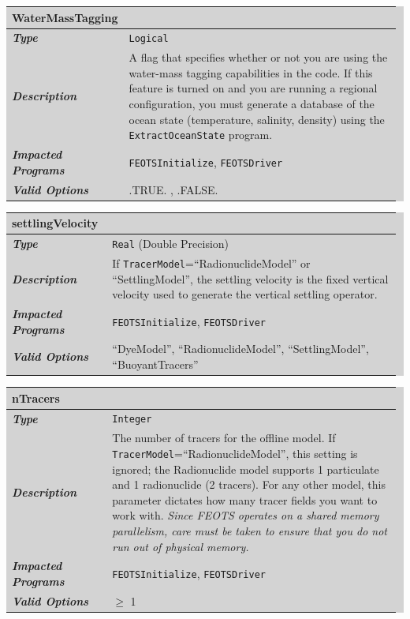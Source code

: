 \documentclass{softwaremanual}
\begin{document}
\noindent\begingroup\setlength{\fboxsep}{0pt}
\colorbox{lightgray}{
\begin{tabular}{p{0.25\linewidth} p{0.725\linewidth}}
\toprule
\textbf{WaterMassTagging} & \\
\midrule
\textbf{\textit{Type}} & \texttt{Logical} \\
\midrule
\textbf{\textit{Description}} & A flag that specifies whether or not you are using the water-mass tagging capabilities in the code. If this feature is turned on and you are running a regional configuration, you must generate a database of the ocean state (temperature, salinity, density) using the \texttt{ExtractOceanState} program. \\
\midrule
\textbf{\textit{Impacted Programs}} & \texttt{FEOTSInitialize}, \texttt{FEOTSDriver} \\
\midrule
\textbf{\textit{Valid Options}}  & .TRUE. , .FALSE. \\
\bottomrule
\end{tabular}
}\endgroup

\noindent\begingroup\setlength{\fboxsep}{0pt}
\colorbox{lightgray}{
\begin{tabular}{p{0.25\linewidth} p{0.725\linewidth}}
\toprule
\textbf{settlingVelocity} & \\
\midrule
\textbf{\textit{Type}} & \texttt{Real} (Double Precision)  \\
\midrule
\textbf{\textit{Description}} & If \texttt{TracerModel}=``RadionuclideModel'' or ``SettlingModel'', the settling velocity is the fixed vertical velocity used to generate the vertical settling operator. \\
\midrule
\textbf{\textit{Impacted Programs}} & \texttt{FEOTSInitialize}, \texttt{FEOTSDriver} \\
\midrule
\textbf{\textit{Valid Options}}  & ``DyeModel'', ``RadionuclideModel'', ``SettlingModel'', ``BuoyantTracers'' \\
\bottomrule
\end{tabular}
}\endgroup


\noindent\begingroup\setlength{\fboxsep}{0pt}
\colorbox{lightgray}{
\begin{tabular}{p{0.25\linewidth} p{0.725\linewidth}}
\toprule
\textbf{nTracers} & \\
\midrule
\textbf{\textit{Type}} & \texttt{Integer} \\
\midrule
\textbf{\textit{Description}} & The number of tracers for the offline model. If \texttt{TracerModel}=``RadionuclideModel'', this setting is ignored; the Radionuclide model supports 1 particulate and 1 radionuclide (2 tracers). For any other model, this parameter dictates how many tracer fields you want to work with. \textit{Since FEOTS operates on a shared memory parallelism, care must be taken to ensure that you do not run out of physical memory.}  \\
\midrule
\textbf{\textit{Impacted Programs}} & \texttt{FEOTSInitialize}, \texttt{FEOTSDriver} \\
\midrule
\textbf{\textit{Valid Options}}  & $\geq$ 1 \\
\bottomrule
\end{tabular}
}\endgroup
\end{document}
